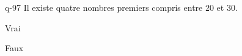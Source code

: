 \begin{truefalse}{q-97}
Il existe quatre nombres premiers compris entre $20$ et $30$.
\item Vrai
\item* Faux
\end{truefalse}

